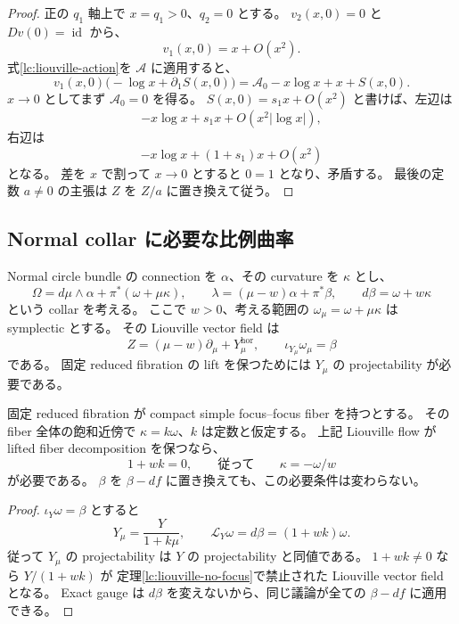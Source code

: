 \begin{proof}
正の $q_1$ 軸上で $x=q_1>0$、$q_2=0$ とする。
$v_2(x,0)=0$ と $Dv(0)=\operatorname{id}$ から、
\[
 v_1(x,0)=x+O(x^2).
\]
式\eqref{lc:liouville-action}を $\mathcal A$ に適用すると、
\[
 v_1(x,0)\bigl(-\log x+\partial_1S(x,0)\bigr)
 =\mathcal A_0-x\log x+x+S(x,0).
\]
$x\to0$ としてまず $\mathcal A_0=0$ を得る。
$S(x,0)=s_1x+O(x^2)$ と書けば、左辺は
\[
 -x\log x+s_1x+O(x^2|\log x|),
\]
右辺は
\[
 -x\log x+(1+s_1)x+O(x^2)
\]
となる。
差を $x$ で割って $x\to0$ とすると $0=1$ となり、矛盾する。
最後の定数 $a\ne0$ の主張は $Z$ を $Z/a$ に置き換えて従う。
\end{proof}

\subsection{Normal collar に必要な比例曲率}
\label{lc:liouville-curvature}

Normal circle bundle の connection を $\alpha$、その curvature を $\kappa$ とし、
\[
 \Omega=d\mu\wedge\alpha+\pi^*(\omega+\mu\kappa),
 \qquad
 \lambda=(\mu-w)\alpha+\pi^*\beta,
 \qquad d\beta=\omega+w\kappa
\]
という collar を考える。
ここで $w>0$、考える範囲の $\omega_\mu=\omega+\mu\kappa$ は symplectic とする。
その Liouville vector field は
\[
 Z=(\mu-w)\partial_\mu+Y_\mu^{\mathrm{hor}},
 \qquad \iota_{Y_\mu}\omega_\mu=\beta
\]
である。
固定 reduced fibration の lift を保つためには $Y_\mu$ の projectability が必要である。

\begin{corollary}
\label{lc:liouville-curvature-cor}
固定 reduced fibration が compact simple focus--focus fiber を持つとする。
その fiber 全体の飽和近傍で $\kappa=k\omega$、$k$ は定数と仮定する。
上記 Liouville flow が lifted fiber decomposition を保つなら、
\[
 1+wk=0,\qquad\text{従って}\qquad \kappa=-\omega/w
\]
が必要である。
$\beta$ を $\beta-df$ に置き換えても、この必要条件は変わらない。
\end{corollary}

\begin{proof}
$\iota_Y\omega=\beta$ とすると
\[
 Y_\mu=\frac{Y}{1+k\mu},
 \qquad \mathcal L_Y\omega=d\beta=(1+wk)\omega.
\]
従って $Y_\mu$ の projectability は $Y$ の projectability と同値である。
$1+wk\ne0$ なら $Y/(1+wk)$ が
定理\ref{lc:liouville-no-focus}で禁止された Liouville vector field となる。
Exact gauge は $d\beta$ を変えないから、同じ議論が全ての $\beta-df$ に適用できる。
\end{proof}

